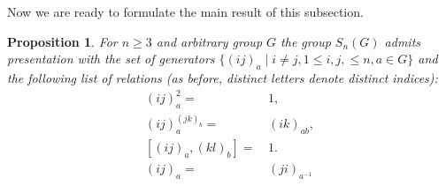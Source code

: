 \documentclass[oneside, 12pt]{amsart}
\theoremstyle{plain}
\numberwithin{equation}{section}
\numberwithin{lemma}{section}
\newtheorem{prop}[lemma]{Proposition}
\theoremstyle{remark}
\theoremstyle{definition}
\begin{document}
 

Now we are ready to formulate the main result of this subsection.
\begin{prop} \label{prop:Q-pres} For $n\geq 3$ and arbitrary group $G$ the group $S_n(G)$ admits presentation with the set of generators 
$\{(ij)_a \mid i\neq j, 1\leq i,j,\leq n, a\in G\}$ and the following list of relations (as before, distinct letters denote distinct indices):
\begin{align}
(ij)_a^2 = &\, 1,                \label{Q1} \tag{SG1} \\
(ij)_a^{(jk)_b} = &\, (ik)_{ab}, \label{Q2} \tag{SG2} \\
[(ij)_a, (kl)_b] = &\,1.         \label{Q3} \tag{SG3} \\
(ij)_a =&\, (ji)_{a^{-1}}        \label{Q4} \tag{SG4} 
\end{align}
\end{prop}
\end{document}

